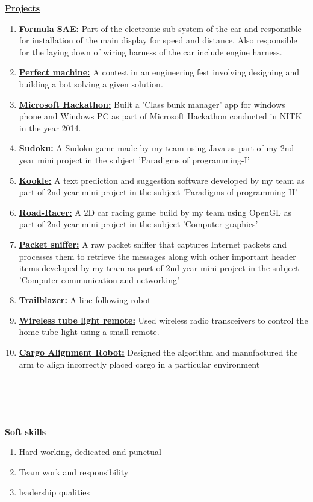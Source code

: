 \documentclass[10pt]{article}
\begin{document}
		\underline{\textbf{\Large{Projects}}}
		\begin{enumerate}
			\item{\underline{\textbf{\large{Formula SAE:}}} Part of the electronic sub system of the car and responsible for installation of the main display for speed and distance. Also responsible for the laying down of wiring harness of the car include engine harness.}
			\item{\underline{\textbf{\large{Perfect machine:}}} A contest in an engineering fest involving designing and building a bot solving a given solution.}
			\item{\underline{\textbf{\large{Microsoft Hackathon:}}} Built a 'Class bunk manager' app for windows phone and Windows PC as part of Microsoft Hackathon conducted in NITK in the year 2014.}
			\item{\underline{\textbf{\large{Sudoku:}}} A Sudoku game made by my team using Java as part of my 2nd year mini project in the subject 'Paradigms of programming-I'}
			\item{\underline{\textbf{\large{Kookle:}}} A text prediction and suggestion software developed by my team as part of 2nd year mini project in the subject 'Paradigms of programming-II'}
			\item{\underline{\textbf{\large{Road-Racer:}}} A 2D car racing game build by my team using OpenGL as part of 2nd year mini project in the subject 'Computer graphics'}
			\item{\underline{\textbf{\large{Packet sniffer:}}} A raw packet sniffer that captures Internet packets and processes them to retrieve the messages along with other important header items developed by my team as part of 2nd year mini project in the subject 'Computer communication and networking'}
			\item{\underline{\textbf{\large{Trailblazer:}}} A line following robot}
			\item{\underline{\textbf{\large{Wireless tube light remote:}}} Used wireless radio transceivers to control the home tube light using a small remote.}
			\item{\underline{\textbf{\large{Cargo Alignment Robot:}}} Designed the algorithm and manufactured the arm to align incorrectly placed cargo in a particular environment} 
		\end{enumerate}
		
		
		\hfill\\
		\hfill\\
		\\ \\
		
			\underline{\textbf{\Large{Soft skills}}}
			\begin{enumerate}
				\item{Hard working, dedicated and punctual}
				\item{Team work and responsibility}
				\item{leadership qualities} 
				
			\end{enumerate}
			
			\hfill
	
\end{document}
